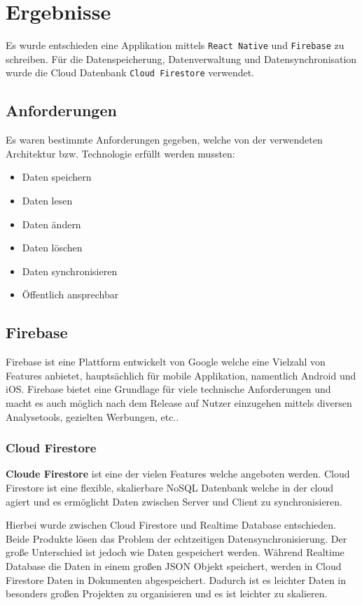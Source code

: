 
\section{Ergebnisse}
\label{sec:Ergebnisse}
Es wurde entschieden eine Applikation mittels \verb|React Native| und \verb|Firebase| zu schreiben. Für die Datenspeicherung, Datenverwaltung und Datensynchronisation wurde die Cloud Datenbank \verb|Cloud Firestore| verwendet. 
\subsection{Anforderungen}
Es waren bestimmte Anforderungen gegeben, welche von der verwendeten Architektur bzw. Technologie erfüllt werden mussten: 
\begin{itemize}
	\item Daten speichern
	\item Daten lesen
	\item Daten ändern
	\item Daten löschen
	\item Daten synchronisieren
	\item Öffentlich ansprechbar
\end{itemize}
\subsection{Firebase}
Firebase ist eine Plattform entwickelt von Google welche eine Vielzahl von Features anbietet, hauptsächlich für mobile Applikation, namentlich Android und iOS. Firebase bietet eine Grundlage für viele technische Anforderungen und macht es auch möglich nach dem Release auf Nutzer einzugehen mittels diversen Analysetools, gezielten Werbungen, etc.. \cite{Firebase64:online}

\subsubsection{Cloud Firestore}
\textbf{Cloude Firestore} ist eine der vielen Features welche angeboten werden. Cloud Firestore ist eine flexible, skalierbare NoSQL Datenbank welche in der cloud agiert und es ermöglicht Daten zwischen Server und Client zu synchronisieren.\cite{CloudFir66:online}

Hierbei wurde zwischen Cloud Firestore und Realtime Database entschieden. Beide Produkte lösen das Problem der echtzeitigen Datensynchronisierung. Der große Unterschied ist jedoch wie Daten gespeichert werden. Während Realtime Database die Daten in einem großen JSON Objekt speichert, werden in Cloud Firestore Daten in Dokumenten abgespeichert. Dadurch ist es leichter Daten in besonders großen Projekten zu organisieren und es ist leichter zu skalieren.


